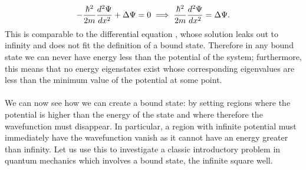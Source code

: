 $$
-\frac{\hbar^2}{2m}\frac{d^{2}\Psi}{dx^2}+\Delta\Psi=0\implies\frac{\hbar^2}{2m}\frac{d^{2}\Psi}{dx^2}=\Delta\Psi.
$$
This is comparable to the differential equation , whose solution leaks out to infinity and does not fit the definition of a bound state. Therefore in any bound state we can never have energy less than the potential of the system; furthermore, this means that no energy eigenstates exist whose corresponding eigenvalues are less than the minimum value of the potential at some point.
\\\\
We can now see how we can create a bound state: by setting regions where the potential is higher than the energy of the state and where therefore the wavefunction must disappear. In particular, a region with infinite potential must immediately have the wavefunction vanish as it cannot have an energy greater than infinity. Let us use this to investigate a classic introductory problem in quantum mechanics which involves a bound state, the infinite square well.
